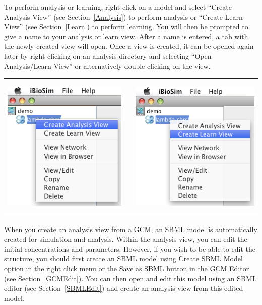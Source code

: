 \documentclass[titlepage,11pt]{article}
\begin{document}
\noindent
To perform analysis or learning, right click on a model and
select ``Create Analysis View'' (see Section~\ref{Analysis})
to perform analysis or ``Create Learn View'' (see Section~\ref{Learn})
to perform learning. You will then be prompted to give a name to
your analysis or learn view. After a name is entered, a tab with
the newly created view will open. Once a view is created, it can
be opened again later by right clicking on an analysis directory
and selecting ``Open Analysis/Learn View'' or alternatively
double-clicking on the view.
\begin{center}
\begin{tabular}{ccc}
\includegraphics[height=70mm]{screenshots/createAnalysis} & & 
\includegraphics[height=70mm]{screenshots/createLearn}
\end{tabular}
\end{center}

When you create an analysis view from a GCM, an SBML model is
automatically created for simulation and analysis. Within the
analysis view, you can edit the initial concentrations and
parameters. However, if you wish to be able to edit the
structure, you should first create an SBML model using Create
SBML Model option in the right click menu or the Save as SBML button in
the GCM Editor (see Section~\ref{GCMEdit}).  You can then open and
edit this model using an SBML editor (see Section~\ref{SBMLEdit}) and
create an analysis view from this edited model.
\end{document}
